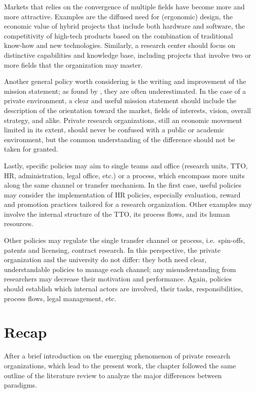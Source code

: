 Markets that relies on the convergence of multiple fields have become more and more attractive. Examples are the diffused need for (ergonomic) design, the economic value of hybrid projects that include both hardware and software, the competitivity of high-tech products based on the combination of traditional know-how and new technologies. Similarly, a research center should focus on distinctive capabilities and knowledge base, including projects that involve two or more fields that the organization may master. 
 
Another general policy worth considering is the writing and improvement of the mission statement; as found by \citet{Fitzgerald2015}, they are often underestimated. In the case of a private environment, a clear and useful mission statement should include the description of the orientation toward the market, fields of interests, vision, overall strategy, and alike. Private research organizations, still an economic movement limited in its extent, should never be confused with a public or academic environment, but the common understanding of the difference should not be taken for granted. 

Lastly, specific policies may aim to single teams and office (research units, TTO, HR, administration, legal office, etc.) or a process, which encompass more units along the same channel or transfer mechanism. In the first case, useful policies may consider the implementation of HR policies, especially evaluation, reward and promotion practices tailored for a research organization. Other examples may involve the internal structure of the TTO, its process flows, and its human resources.

Other policies may regulate the single transfer channel or process, i.e.\ spin-offs, patents and licensing, contract research. In this perspective, the private organization and the university do not differ: they both need clear, understandable policies to manage each channel; any misunderstanding from researchers may decrease their motivation and performance. Again, policies should establish which internal actors are involved, their tasks, responsibilities, process flows, legal management, etc.

\section{Recap}

After a brief introduction on the emerging phenomenon of private research organizations, which lead to the present work, the chapter followed the same outline of the literature review to analyze the major differences between paradigms.

